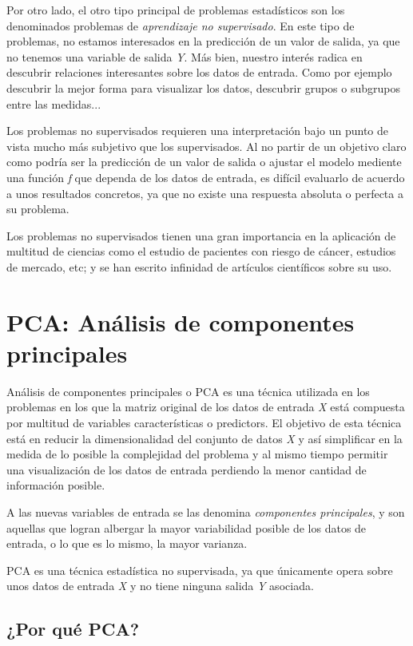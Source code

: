 \documentclass[12pt,a4paper,Spanish]{book}
\begin{document}
Por otro lado, el otro tipo principal de problemas estadísticos son los denominados problemas de \textit{aprendizaje no supervisado}. En este tipo de problemas, no estamos interesados en la predicción de un valor de salida, ya que no tenemos una variable de salida \textit{Y}. Más bien, nuestro interés radica en descubrir relaciones interesantes sobre los datos de entrada. Como por ejemplo descubrir la mejor forma para visualizar los datos, descubrir grupos o subgrupos entre las medidas...

Los problemas no supervisados requieren una interpretación bajo un punto de vista mucho más subjetivo que los supervisados. Al no partir de un objetivo claro como podría ser la predicción de un valor de salida o ajustar el modelo mediente una función \textit{f} que dependa de los datos de entrada, es difícil evaluarlo de acuerdo a unos resultados concretos, ya que no existe una respuesta absoluta o perfecta a su problema.

Los problemas no supervisados tienen una gran importancia en la aplicación de multitud de ciencias como el estudio de pacientes con riesgo de cáncer, estudios de mercado, etc; y se han escrito infinidad de artículos científicos sobre su uso.



\chapter{PCA: Análisis de componentes principales}

Análisis de componentes principales o PCA es una técnica utilizada en los problemas en los que la matriz original de los datos de entrada \textit{X} está compuesta por multitud de variables características o predictors. El objetivo de esta técnica está en reducir la dimensionalidad del conjunto de datos \textit{X} y así simplificar en la medida de lo posible la complejidad del problema y al mismo tiempo permitir una visualización de los datos de entrada perdiendo la menor cantidad de información posible.

A las nuevas variables de entrada se las denomina \textit{componentes principales}, y son aquellas que logran albergar la mayor variabilidad posible de los datos de entrada, o lo que es lo mismo, la mayor varianza.

PCA es una técnica estadística no supervisada, ya que únicamente opera sobre unos datos de entrada \textit{X} y no tiene ninguna salida \textit{Y} asociada. 


\section{¿Por qué PCA?}
\end{document}
